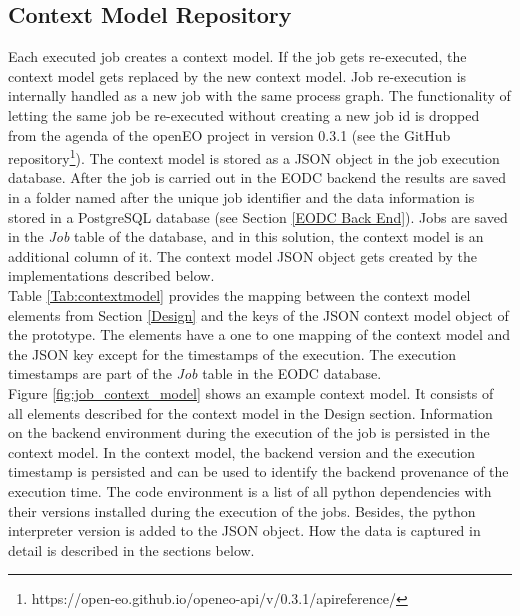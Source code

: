 \documentclass[draft,final]{vutinfth} %
\begin{document}
\subsection{Context Model Repository}\label{Implementation:Provenance Repository}
Each executed job creates a context model. If the job gets re-executed, the context model gets replaced by the new context model. Job re-execution is internally handled as a new job with the same process graph. The functionality of letting the same job be re-executed without creating a new job id is dropped from the agenda of the openEO project in version 0.3.1 (see the GitHub repository\footnote{https://open-eo.github.io/openeo-api/v/0.3.1/apireference/}). 
The context model is stored as a JSON object in the job execution database. After the job is carried out in the EODC backend the results are saved in a folder named after the unique job identifier and the data information is stored in a PostgreSQL database (see Section \ref{EODC Back End}). Jobs are saved in the \textit{Job} table of the database, and in this solution, the context model is an additional column of it. The context model JSON object gets created by the implementations described below. \\
Table \ref{Tab:contextmodel} provides the mapping between the context model elements from Section \ref{Design} and the keys of the JSON context model object of the prototype. The elements have a one to one mapping of the context model and the JSON key except for the timestamps of the execution. The execution timestamps are part of the \textit{Job} table in the EODC database. \\
Figure \ref{fig:job_context_model} shows an example context model. It consists of all elements described for the context model in the Design section. Information on the backend environment during the execution of the job is persisted in the context model. In the context model, the backend version and the execution timestamp is persisted and can be used to identify the backend provenance of the execution time. The code environment is a list of all python dependencies with their versions installed during the execution of the jobs. Besides, the python interpreter version is added to the JSON object. How the data is captured in detail is described in the sections below.    
  
\end{document}
